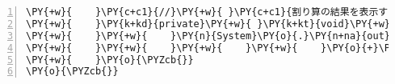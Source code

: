 \begin{Verbatim}[commandchars=\\\{\},numbers=left,firstnumber=1,stepnumber=1,frame=single,fontsize=\small]
\PY{+w}{    }\PY{c+c1}{//}\PY{+w}{ }\PY{c+c1}{割り算の結果を表示する}
\PY{+w}{    }\PY{k+kd}{private}\PY{+w}{ }\PY{k+kt}{void}\PY{+w}{ }\PY{n+nf}{output}\PY{o}{(}\PY{n}{QuotientAndRemainder}\PY{+w}{ }\PY{n}{output}\PY{o}{)}\PY{+w}{ }\PY{o}{\PYZob{}}
\PY{+w}{    }\PY{+w}{    }\PY{n}{System}\PY{o}{.}\PY{n+na}{out}\PY{o}{.}\PY{n+na}{print}\PY{o}{(}\PY{l+s}{"商は"}\PY{+w}{ }\PY{o}{+}\PY{+w}{ }\PY{n}{output}\PY{o}{.}\PY{n+na}{quotient}
\PY{+w}{    }\PY{+w}{    }\PY{+w}{    }\PY{+w}{    }\PY{o}{+}\PY{+w}{ }\PY{l+s}{"で余は"}\PY{+w}{ }\PY{o}{+}\PY{+w}{ }\PY{n}{output}\PY{o}{.}\PY{n+na}{remainder}\PY{+w}{ }\PY{o}{+}\PY{+w}{ }\PY{l+s}{"です"}\PY{o}{)}\PY{o}{;}
\PY{+w}{    }\PY{o}{\PYZcb{}}
\PY{o}{\PYZcb{}}
\end{Verbatim}
